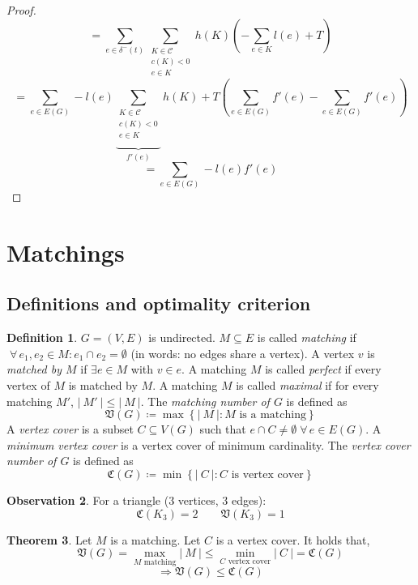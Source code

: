 \documentclass[a4paper]{article}
\theoremstyle{definition}
\newtheorem{theorem}{Theorem}
\newtheorem{definition}[theorem]{Definition}
\newtheorem{observation}[theorem]{Observation}
\newcommand{\card}[1]{\left|\:\!#1\:\!\right|}
\newcommand{\set}[1]{\left\{#1\right\}}
\newcommand{\fall}{\;\forall\,}
\begin{document}
\begin{proof}
\begin{equation*}
      = \sum_{e \in \delta^-(t)} \sum_{\substack{K \in \mathcal{C} \\ c(K) < 0 \\ e \in K}} h(K) \left(
        -\sum_{e \in K} l(e) + T
      \right)
  \end{equation*} \begin{equation*}
    = \sum_{e \in E(G)} -l(e) \underbrace{\sum_{\substack{K \in \mathcal{C} \\ c(K) < 0 \\ e \in K}}}_{f'(e)} h(K)
    + T \left(\sum_{e \in E(G)} f'(e) - \sum_{e \in E(G)} f'(e)\right)
  \end{equation*} \begin{equation*}
    = \sum_{e \in E(G)} -l(e) f'(e)
  \end{equation*}
\end{proof}

\section{Matchings}
%
\subsection{Definitions and optimality criterion}
%
\begin{definition}
  $G = (V, E)$ is undirected.
  $M \subseteq E$ is called \emph{matching} if $\fall e_1, e_2 \in M: e_1 \cap e_2 = \emptyset$ (in words: no edges share a vertex).
  A vertex $v$ is \emph{matched by $M$} if $\exists e \in M$ with $v \in e$.
  A matching $M$ is called \emph{perfect} if every vertex of $M$ is matched by $M$.
  A matching $M$ is called \emph{maximal} if for every matching $M'$, $\card{M'} \leq \card{M}$.
  The \emph{matching number of $G$} is defined as
  \[ \mathfrak V(G) \coloneqq \max\set{\card{M}: M \text{ is a matching}} \]
  A \emph{vertex cover} is a subset $C \subseteq V(G)$ such that $e \cap C \neq \emptyset \fall e \in E(G)$.
  A \emph{minimum vertex cover} is a vertex cover of minimum cardinality.
  The \emph{vertex cover number of $G$} is defined as
  \[ \mathfrak C(G) \coloneqq \min\set{\card{C}: C \text{ is vertex cover}} \]
\end{definition}
%
\begin{observation}
  For a triangle (3 vertices, 3 edges):
  \[ \mathfrak C(K_3) = 2 \qquad \mathfrak V(K_3) = 1 \]
\end{observation}
\begin{theorem}
  Let $M$ is a matching. Let $C$ is a vertex cover. It holds that,
  \[
    \mathfrak V(G)
      = \max_{\text{$M$ matching}} \card{M}
      \leq \min_{\text{$C$ vertex cover}} \card{C}
      = \mathfrak C(G)
  \] \[
    \Rightarrow \mathfrak V(G) \leq \mathfrak C(G)
  \]
\end{theorem}
\end{document}
